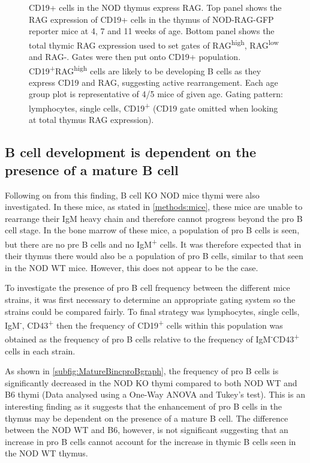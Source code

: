 \begin{figure}
\caption{CD19+ cells in the NOD thymus express RAG. 
Top panel shows the RAG expression of CD19+ cells in the thymus of NOD-RAG-GFP reporter mice at 4, 7 and 11 weeks of age. Bottom panel shows the total thymic RAG expression used to set gates of RAG\textsuperscript{high}, RAG\textsuperscript{low} and RAG-. 
Gates were then put onto CD19+ population. 
CD19\textsuperscript{+}RAG\textsuperscript{high} cells are likely to be developing B cells as they express CD19 and RAG, suggesting active rearrangement. 
Each age group plot is representative of 4/5 mice of given age.
Gating pattern: lymphocytes, single cells, CD19\textsuperscript{+} (CD19 gate omitted when looking at total thymus RAG expression).}
\end{figure}



\subsection{B cell development is dependent on the presence of a mature B cell}

Following on from this finding, B cell KO NOD mice thymi were also investigated.
In these mice, as stated in \cref{methods:mice}, these mice are unable to rearrange their IgM heavy chain and therefore cannot progress beyond the pro B cell stage. 
In the bone marrow of these mice, a population of pro B cells is seen, but there are no pre B cells and no IgM\textsuperscript{+} cells.
It was therefore expected that in their thymus there would also be a population of pro B cells, similar to that seen in the NOD WT mice. 
However, this does not appear to be the case.

To investigate the presence of pro B cell frequency between the different mice strains, it was first necessary to determine an appropriate gating system so the strains could be compared fairly.
To final strategy was lymphocytes, single cells, IgM\textsuperscript{-}, CD43\textsuperscript{+} then the frequency of CD19\textsuperscript{+} cells within this population was obtained as the frequency of pro B cells relative to the frequency of IgM\textsuperscript{-}CD43\textsuperscript{+} cells in each strain.

As shown in \cref{subfig:MatureBincproBgraph}, the frequency of pro B cells is significantly decreased in the NOD KO thymi compared to both NOD WT and B6 thymi (Data analysed using a One-Way ANOVA and Tukey's test).
This is an interesting finding as it suggests that the enhancement of pro B cells in the thymus may be dependent on the presence of a mature B cell.
The difference between the NOD WT and B6, however, is not significant suggesting that an increase in pro B cells cannot account for the increase in thymic B cells seen in the NOD WT thymus.

